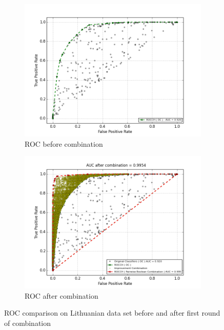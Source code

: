 \begin{figure}[H]
    \centering
    \begin{adjustbox}{minipage=\linewidth,scale=1.1}
    \begin{subfigure}[b]{0.5\columnwidth}
        \centering
        \includegraphics[width=\linewidth]{figs/ROCHLeft-Lithuanian}
        \caption{ROC before combination}
        \label{fig:ROC_left_lithuanian} 
    \end{subfigure}
    \begin{subfigure}[b]{0.5\columnwidth}
        \centering
        \includegraphics[width=\linewidth]{figs/ROCHRight-Lithuanian}
        \caption{ROC after combination}
        \label{fig:ROC_right_lithuanian}
    \end{subfigure}
    \caption{ROC comparison on Lithuanian data set before and after first round of combination}
    \label{fig:ROC_comparison_lithuanian}
    \end{adjustbox}
\end{figure}


